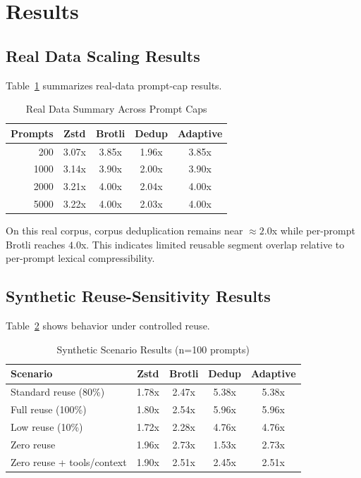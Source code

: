 \documentclass[10pt,conference]{IEEEtran}
\begin{document}
\section{Results}
\subsection{Real Data Scaling Results}
Table~\ref{tab:real_caps} summarizes real-data prompt-cap results.

\begin{table}[h]
\centering
\caption{Real Data Summary Across Prompt Caps}
\label{tab:real_caps}
\renewcommand{\arraystretch}{1.2}
\begin{tabular}{|r|c|c|c|c|}
\hline
\textbf{Prompts} & \textbf{Zstd} & \textbf{Brotli} & \textbf{Dedup} & \textbf{Adaptive} \\
\hline
200 & 3.07x & 3.85x & 1.96x & 3.85x \\
1000 & 3.14x & 3.90x & 2.00x & 3.90x \\
2000 & 3.21x & 4.00x & 2.04x & 4.00x \\
5000 & 3.22x & 4.00x & 2.03x & 4.00x \\
\hline
\end{tabular}
\end{table}

On this real corpus, corpus deduplication remains near \(\approx 2.0\)x while per-prompt Brotli reaches \(4.0\)x. This indicates limited reusable segment overlap relative to per-prompt lexical compressibility.

\subsection{Synthetic Reuse-Sensitivity Results}
Table~\ref{tab:synthetic_scenarios} shows behavior under controlled reuse.

\begin{table}[h]
\centering
\caption{Synthetic Scenario Results (n=100 prompts)}
\label{tab:synthetic_scenarios}
\renewcommand{\arraystretch}{1.2}
\begin{tabular}{|l|c|c|c|c|}
\hline
\textbf{Scenario} & \textbf{Zstd} & \textbf{Brotli} & \textbf{Dedup} & \textbf{Adaptive} \\
\hline
Standard reuse (80\%) & 1.78x & 2.47x & 5.38x & 5.38x \\
Full reuse (100\%) & 1.80x & 2.54x & 5.96x & 5.96x \\
Low reuse (10\%) & 1.72x & 2.28x & 4.76x & 4.76x \\
Zero reuse & 1.96x & 2.73x & 1.53x & 2.73x \\
Zero reuse + tools/context & 1.90x & 2.51x & 2.45x & 2.51x \\
\hline
\end{tabular}
\end{table}
\end{document}

